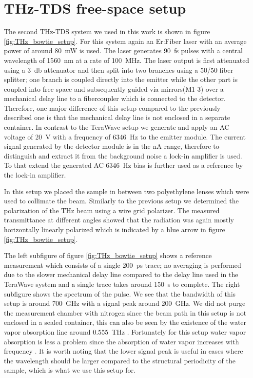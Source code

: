 \section{THz-TDS free-space setup}
The second THz-TDS system we used in this work is shown in figure \ref{fig:THz_bowtie_setup}. For this system again an Er:Fiber laser with an average power of around \SI{80}{\milli \watt} is used. The laser generates \SI{90}{\femto \second} pulses with a central wavelength of \SI{1560}{\nano \meter} at a rate of \SI{100}{\mega \hertz}. The laser output is first attenuated using a \SI{3}{\decibel} attenuator and then split into two branches using a 50/50 fiber splitter; one branch is coupled directly into the emitter while the other part is coupled into free-space and subsequently guided via mirrors(M1-3) over a mechanical delay line to a fibercoupler which is connected to the detector. Therefore, one major difference of this setup compared to the previously described one is that the mechanical delay line is not enclosed in a separate container. In contrast to the TeraWave setup we generate and apply an AC voltage of \SI{20}{\volt} with a frequency of \SI{6346}{\hertz} to the emitter module. The current signal generated by the detector module is in the \si{\nano \ampere} range, therefore to distinguish and extract it from the background noise a lock-in amplifier is used. To that extend the generated AC \SI{6346}{\hertz} bias is further used as a reference by the lock-in amplifier.

In this setup we placed the sample in between two polyethylene lenses which were used to collimate the beam. Similarly to the previous setup we determined the polarization of the THz beam using a wire grid polarizer. The measured transmittance at different angles showed that the radiation was again mostly horizontally linearly polarized which is indicated by a blue arrow in figure \ref{fig:THz_bowtie_setup}. 

The left subfigure of figure \ref{fig:THz_bowtie_setup} shows a reference measurement which consists of a single \SI{200}{\pico \second} trace; no averaging is performed due to the slower mechanical delay line compared to the delay line used in the TeraWave system and a single trace takes around \SI{150}{\second} to complete. The right subfigure shows the spectrum of the pulse. We see that the bandwidth of this setup is around \SI{700}{\giga \hertz} with a signal peak around \SI{200}{\giga \hertz}. We did not purge the measurement chamber with nitrogen since the beam path in this setup is not enclosed in a sealed container, this can also be seen by the existence of the water vapor absorption line around \SI{0.555}{\tera \hertz} \cite{VanExter1989}. Fortunately for this setup water vapor absorption is less a problem since the absorption of water vapor increases with frequency \cite{Series2019}. It is worth noting that the lower signal peak is useful in cases where the wavelength should be larger compared to the structural periodicity of the sample, which is what we use this setup for. 

